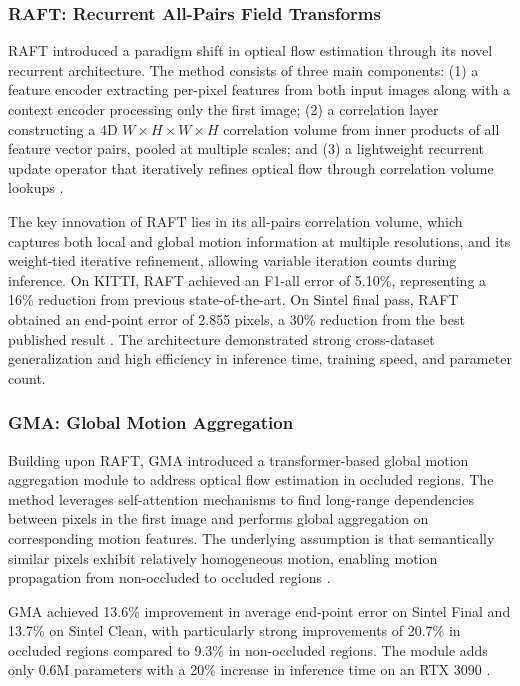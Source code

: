 \subsubsection{RAFT: Recurrent All-Pairs Field Transforms}

RAFT \cite{teed2020raft} introduced a paradigm shift in optical flow estimation through its novel recurrent architecture. The method consists of three main components: (1) a feature encoder extracting per-pixel features from both input images along with a context encoder processing only the first image; (2) a correlation layer constructing a 4D $W \times H \times W \times H$ correlation volume from inner products of all feature vector pairs, pooled at multiple scales; and (3) a lightweight recurrent update operator that iteratively refines optical flow through correlation volume lookups \cite{teed2020raft}.

The key innovation of RAFT lies in its all-pairs correlation volume, which captures both local and global motion information at multiple resolutions, and its weight-tied iterative refinement, allowing variable iteration counts during inference. On KITTI, RAFT achieved an F1-all error of 5.10\%, representing a 16\% reduction from previous state-of-the-art. On Sintel final pass, RAFT obtained an end-point error of 2.855 pixels, a 30\% reduction from the best published result \cite{teed2020raft}. The architecture demonstrated strong cross-dataset generalization and high efficiency in inference time, training speed, and parameter count.

\subsubsection{GMA: Global Motion Aggregation}

Building upon RAFT, GMA \cite{jiang2021gma} introduced a transformer-based global motion aggregation module to address optical flow estimation in occluded regions. The method leverages self-attention mechanisms to find long-range dependencies between pixels in the first image and performs global aggregation on corresponding motion features. The underlying assumption is that semantically similar pixels exhibit relatively homogeneous motion, enabling motion propagation from non-occluded to occluded regions \cite{jiang2021gma}.

GMA achieved 13.6\% improvement in average end-point error on Sintel Final and 13.7\% on Sintel Clean, with particularly strong improvements of 20.7\% in occluded regions compared to 9.3\% in non-occluded regions. The module adds only 0.6M parameters with a 20\% increase in inference time on an RTX 3090 \cite{jiang2021gma}.

